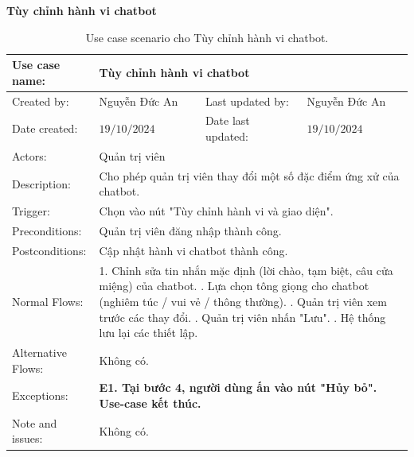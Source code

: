 \textbf{Tùy chỉnh hành vi chatbot}
\begin{table}[H]
	\centering
	\begin{tabular}{|l|l|l|l|} 
		\hline Use case name: & \multicolumn{3}{|l|}{Tùy chỉnh hành vi chatbot} \\ 
		\hline Created by: & Nguyễn Đức An & Last updated by: & Nguyễn Đức An \\ 
		\hline Date created: & $19 / 10 / 2024$ & Date last updated: & $19 / 10 / 2024$\\ 
		\hline Actors: & \multicolumn{3}{|l|}{ Quản trị viên } \\ 
		\hline Description: & \multicolumn{3}{|p{12cm}|}{ Cho phép quản trị viên thay đổi một số đặc điểm ứng xử của chatbot. } \\ 
		\hline Trigger: & \multicolumn{3}{|p{12cm}|}{ Chọn vào nút "Tùy chỉnh hành vi và giao diện". } \\ 
		\hline Preconditions: & \multicolumn{3}{|p{12cm}|}{ 
			Quản trị viên đăng nhập thành công. 
		} \\ 
		\hline Postconditions: & \multicolumn{3}{|p{12cm}|}{ 
			Cập nhật hành vi chatbot thành công. 
		} \\ 
		\hline Normal Flows: & \multicolumn{3}{|p{12cm}|}{ 
			1. Chỉnh sửa tin nhắn mặc định (lời chào, tạm biệt, câu cửa miệng) của chatbot. \newline 
			2. Lựa chọn tông giọng cho chatbot (nghiêm túc / vui vẻ / thông thường). \newline 
			3. Quản trị viên xem trước các thay đổi. \newline
			4. Quản trị viên nhấn "Lưu". \newline
			5. Hệ thống lưu lại các thiết lập.
		} \\ 
		\hline Alternative Flows: & \multicolumn{3}{|p{12cm}|}{ Không có. } \\ 
		\hline Exceptions: & \multicolumn{3}{|p{12cm}|}{ 
			\textbf{E1. Tại bước 4, người dùng ấn vào nút "Hủy bỏ". Use-case kết thúc. }
		} \\ 
		\hline Note and issues: & \multicolumn{3}{|p{12cm}|}{ Không có. } \\ 
		\hline
	\end{tabular}
	\caption{Use case scenario cho Tùy chỉnh hành vi chatbot.}
\end{table}

